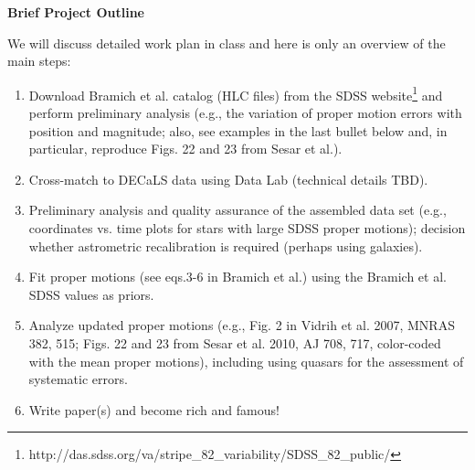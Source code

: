 \documentclass[10pt]{article}
\begin{document}
\vskip 0.2in
{\bf Brief Project Outline}

We will discuss detailed work plan in class and here is only an overview of the
main steps: 
\begin{enumerate}
\item Download Bramich et al. catalog (HLC files) from the SDSS
website\footnote{http://das.sdss.org/va/stripe\_82\_variability/SDSS\_82\_public/}
and perform preliminary analysis (e.g., the variation of proper motion errors with 
 position and magnitude; also, see examples in the last bullet below and, in particular,
    reproduce Figs. 22 and 23 from Sesar et al.). 
\item Cross-match to DECaLS data using Data Lab (technical details TBD). 
\item Preliminary analysis and quality assurance of the assembled data set (e.g., 
          coordinates vs. time plots for stars with large SDSS proper motions); 
          decision whether astrometric recalibration is required (perhaps using galaxies). 
\item Fit proper motions (see eqs.3-6 in Bramich et al.)  using the Bramich et al. SDSS values as priors. 
\item Analyze updated proper motions (e.g., Fig. 2 in Vidrih et al. 2007, MNRAS 382, 515;
   Figs. 22 and 23 from Sesar et al. 2010, AJ 708, 717, color-coded with the mean proper 
   motions), including using quasars for the assessment of systematic errors. 
\item Write paper(s) and become rich and famous! 
\end{enumerate}
\end{document}
